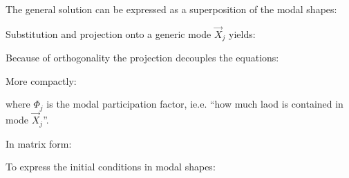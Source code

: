 \documentclass[10pt,a4paper]{scrartcl}
\begin{document}
\begin{multicols*}{2}

The general solution can be expressed as a superposition of the modal shapes:


Substitution and projection onto a generic mode $\vec{X}_j$ yields:


Because of orthogonality the projection decouples the equations:


More compactly:


where $\Phi_j$ is the modal participation factor, ie.e. ``how much laod is contained in mode $\vec{X}_j$''.

In matrix form:



To express the initial conditions in modal shapes:


\end{multicols*}
\end{document}
